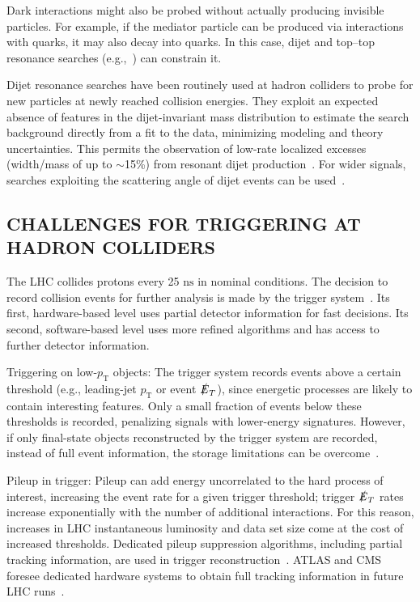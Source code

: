 \documentclass{ar-1col}
\newcommand{\IP}{invisible particle}
\newcommand{\pt}{\ensuremath{p_\mathrm{T}}\xspace}
\newcommand{\MET}{\ensuremath{\slashed{E}_T}\xspace}
\begin{document}
Dark interactions might also be probed without actually producing
{\IP}s. For example, if the mediator particle can be produced via
interactions with quarks, it may also decay into quarks. In this
case, dijet and top--top resonance searches (e.g.,~) can constrain it.

Dijet resonance searches have been routinely used at hadron
colliders to probe for new particles at newly reached collision
energies. They exploit an expected absence of features in the
dijet-invariant mass distribution to estimate the search
background directly from a fit to the data, minimizing modeling
and theory uncertainties. This permits the observation of low-rate
localized excesses (width/mass of up to $\sim$15\%) from resonant
dijet production~\cite{Aaboud:2017yvp,CMS-PAS-EXO-16-056}. For
wider signals, searches exploiting the scattering angle of dijet
events can be used~\cite{CMS-PAS-EXO-16-046,Aaboud:2017yvp}.

\begin{textbox}
\section{CHALLENGES FOR TRIGGERING AT HADRON COLLIDERS}

\noindent The LHC collides protons every 25 $\mathrm{ns}$ in nominal
conditions. The decision to record collision events for further
analysis is made by the trigger
system~\cite{Smith:2016vcs,Aaboud:2016leb,Khachatryan:2016bia}.
Its first, hardware-based level uses partial detector information
for fast decisions. Its second, software-based level uses more
refined algorithms and has access to further detector information.

{Triggering on low-\pt objects}: The trigger system records
events above a certain threshold (e.g., leading-jet \pt or event
\MET), since energetic processes are likely to contain interesting
features. Only a small fraction of events below these thresholds
is recorded, penalizing signals with lower-energy signatures.
However, if only final-state objects reconstructed by the trigger
system are recorded, instead of full event information, the
storage limitations can be
overcome~\cite{Aaij:2016rxn,CMS-PAS-EXO-16-056,Aaboud:2016leb}.

{{Pileup} in trigger}: Pileup can add energy
uncorrelated to the hard process of interest, increasing the event
rate for a given trigger threshold; trigger \MET rates increase
exponentially with the number of additional interactions. For this
reason, increases in LHC instantaneous luminosity and data set size
come at the cost of increased thresholds. Dedicated pileup
suppression algorithms, including partial tracking information, are
used in trigger
reconstruction~\cite{CMS:2014ata,ATLAS-CONF-2014-019}. ATLAS and
CMS foresee dedicated hardware systems to obtain full tracking
information in future LHC
runs~\cite{Shochet:2013gaw,1748-0221-6-12-C12065}.
\end{textbox}
\end{document}
